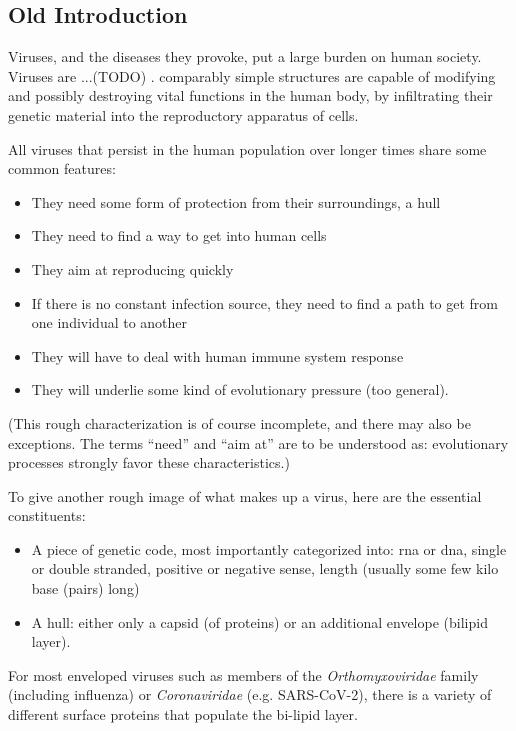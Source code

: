 \documentclass[12pt]{scrartcl}
\newcommand{\red}[1]{{\color{red}#1}}
\newcommand{\gray}[1]{{\color{gray}#1}}
\begin{document}
  \subsection*{Old Introduction}
    \gray{

      Viruses, and the diseases they provoke, put a large burden on human society. \red{Viruses are ...(TODO) .} comparably simple structures are capable of modifying and possibly destroying vital functions in the human body, by infiltrating their genetic material into the reproductory apparatus of cells.

      All viruses that persist in the human population over longer times share some common features:
      \begin{itemize}
        \item They need some form of protection from their surroundings, a hull
        \item They need to find a way to get into human cells
        \item They aim at reproducing quickly
        \item If there is no constant infection source, they need to find a path to get from one individual to another
        \item They will have to deal with human immune system response
        \item They will underlie some kind of evolutionary pressure (too general).
      \end{itemize}

      (This rough characterization is of course incomplete, and there may also be exceptions. The terms ``need'' and ``aim at'' are to be understood as: evolutionary processes strongly favor these characteristics.)

      To give another rough image of what makes up a virus, here are the essential constituents:
      \begin{itemize}
        \item A piece of genetic code, most importantly categorized into: \acrfull{rna} or \acrfull{dna}, single or double stranded, positive or negative sense, length (usually some few kilo base (pairs) long)
        \item A hull: either only a capsid (of proteins) or an additional envelope (bilipid layer).
      \end{itemize}

      For most enveloped viruses such as members of the \textit{Orthomyxoviridae} family (including influenza) or \textit{Coronaviridae} (e.g. SARS-CoV-2), there is a variety of different surface proteins that populate the bi-lipid layer.

}
\end{document}
